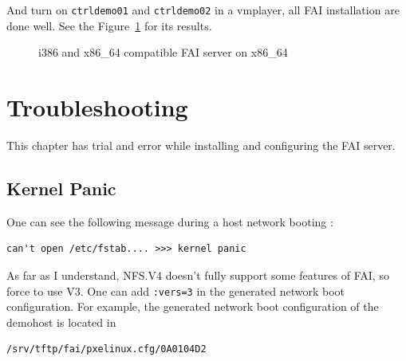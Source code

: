 \documentclass[11pt
  , a4paper
  , article
  , oneside
]{memoir}
\begin{document}
And turn on \texttt{ctrldemo01} and \texttt{ctrldemo02} in a vmplayer, all FAI installation are done well. See the Figure~\ref{fig:ctrldemo1and2} for its results.

\begin{figure}[!htb]
  \centering
 
            \hfill
  \caption
      {
        i386 and x86\_{64} compatible FAI server on x86\_{64}
      }
 \label{fig:ctrldemo1and2}
\end{figure}

\chapter{Troubleshooting}
This chapter has trial and error while installing and configuring the FAI server. 

\section{Kernel Panic}
One can see the following message during a host network booting :

\begin{lstlisting}
can't open /etc/fstab.... >>> kernel panic
\end{lstlisting}
As far as I understand, NFS.V4 doesn't fully support some features of FAI, so force to use V3. One can add \texttt{:vers=3} in the generated network boot configuration. For example, the generated network boot configuration of the demohost is located in 
\begin{lstlisting}
/srv/tftp/fai/pxelinux.cfg/0A0104D2
\end{lstlisting}
\end{document}
